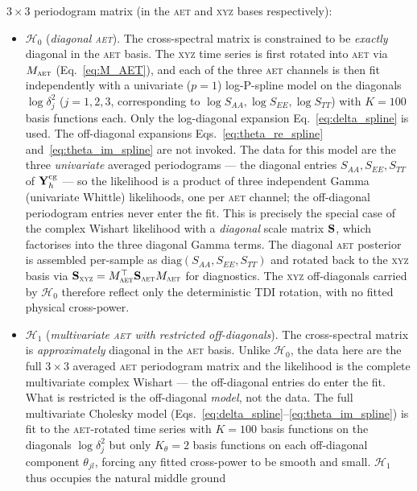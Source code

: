 \documentclass[%
	reprint,
	nofootinbib,
	amsmath,
	amssymb,
	aps,
]{revtex4-2}
\renewcommand{\S}{{\bf S}}
\newcommand{\Y}{{\bf Y}}
\newcommand{\AET}{\textsc{aet}\xspace}
\newcommand{\XYZ}{\textsc{xyz}\xspace}
\begin{document}
	$3\times3$ periodogram matrix (in the \AET and \XYZ bases
	respectively):
	\begin{itemize}
		\item $\mathcal{H}_{0}$ (\emph{diagonal \AET}).
		The cross-spectral matrix is constrained to be \emph{exactly}
		diagonal in the \AET basis. The \XYZ time series is first
		rotated into \AET via $M_{\AET}$ (Eq.~\ref{eq:M_AET}),
		and each of the three \AET channels is then fit independently
		with a univariate ($p=1$) log-P-spline model on the diagonals
		$\log\delta_{j}^{2}$ ($j=1,2,3$, corresponding to
		$\log S_{AA}, \log S_{EE}, \log S_{TT}$) with $K=100$ basis
		functions each. Only the log-diagonal expansion
		Eq.~\eqref{eq:delta_spline} is used. The off-diagonal
		expansions Eqs.~\eqref{eq:theta_re_spline}
		and~\eqref{eq:theta_im_spline} are not invoked.
		The data for this model are the three \emph{univariate}
		averaged periodograms --- the diagonal entries
		$S_{AA}, S_{EE}, S_{TT}$ of $\Y_{h}^{\mathrm{cg}}$ --- so the
		likelihood is a product of three independent Gamma
		(univariate Whittle) likelihoods, one per \AET channel; the
		off-diagonal periodogram entries never enter the fit. This is
		precisely the special case of the complex Wishart likelihood
		with a \emph{diagonal} scale matrix $\S$, which factorises
		into the three diagonal Gamma terms. The diagonal \AET posterior is assembled
		per-sample as $\mathrm{diag}(S_{AA},S_{EE},S_{TT})$ and
		rotated back to the \XYZ basis via
		$\S_{\XYZ}=M_{\AET}^{\top}\S_{\AET}M_{\AET}$
		for diagnostics. The \XYZ off-diagonals carried by
		$\mathcal{H}_{0}$ therefore reflect only the deterministic
		TDI rotation, with no fitted physical cross-power.
		\item $\mathcal{H}_{1}$ (\emph{multivariate \AET with
		restricted off-diagonals}). The cross-spectral matrix is
		\emph{approximately} diagonal in the \AET basis. Unlike
		$\mathcal{H}_{0}$, the data here are the full $3\times3$
		averaged \AET periodogram matrix and the likelihood is the
		complete multivariate complex Wishart --- the off-diagonal
		entries do enter the fit. What is restricted is the
		off-diagonal \emph{model}, not the data. The full
		multivariate Cholesky model
		(Eqs.~\ref{eq:delta_spline}--\ref{eq:theta_im_spline})
		is fit to the \AET-rotated time series with $K=100$ basis
		functions on the diagonals $\log\delta_{j}^{2}$ but only $K_{\theta}=2$
		basis functions on each off-diagonal component $\theta_{jl}$, forcing
		any fitted cross-power to be smooth and small.
		$\mathcal{H}_{1}$ thus occupies the natural middle ground

\end{itemize}
\end{document}
